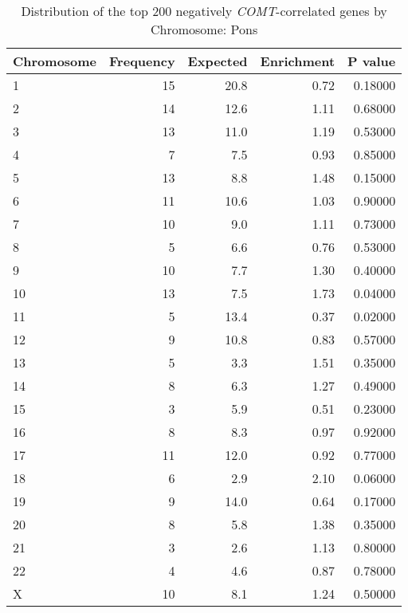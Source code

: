\begin{longtable}{lrrrr}
\caption{Distribution of the top 200 negatively \textit{COMT}-correlated genes by \\ Chromosome: Pons} \\ 
  \toprule
Chromosome & Frequency & Expected & Enrichment & P value \\ 
  \midrule
1 & 15 & 20.8 & 0.72 & 0.18000 \\ 
  2 & 14 & 12.6 & 1.11 & 0.68000 \\ 
  3 & 13 & 11.0 & 1.19 & 0.53000 \\ 
  4 & 7 & 7.5 & 0.93 & 0.85000 \\ 
  5 & 13 & 8.8 & 1.48 & 0.15000 \\ 
  6 & 11 & 10.6 & 1.03 & 0.90000 \\ 
  7 & 10 & 9.0 & 1.11 & 0.73000 \\ 
  8 & 5 & 6.6 & 0.76 & 0.53000 \\ 
  9 & 10 & 7.7 & 1.30 & 0.40000 \\ 
  10 & 13 & 7.5 & 1.73 & 0.04000 \\ 
  11 & 5 & 13.4 & 0.37 & 0.02000 \\ 
  12 & 9 & 10.8 & 0.83 & 0.57000 \\ 
  13 & 5 & 3.3 & 1.51 & 0.35000 \\ 
  14 & 8 & 6.3 & 1.27 & 0.49000 \\ 
  15 & 3 & 5.9 & 0.51 & 0.23000 \\ 
  16 & 8 & 8.3 & 0.97 & 0.92000 \\ 
  17 & 11 & 12.0 & 0.92 & 0.77000 \\ 
  18 & 6 & 2.9 & 2.10 & 0.06000 \\ 
  19 & 9 & 14.0 & 0.64 & 0.17000 \\ 
  20 & 8 & 5.8 & 1.38 & 0.35000 \\ 
  21 & 3 & 2.6 & 1.13 & 0.80000 \\ 
  22 & 4 & 4.6 & 0.87 & 0.78000 \\ 
  X & 10 & 8.1 & 1.24 & 0.50000 \\ 
   \bottomrule
\end{longtable}
